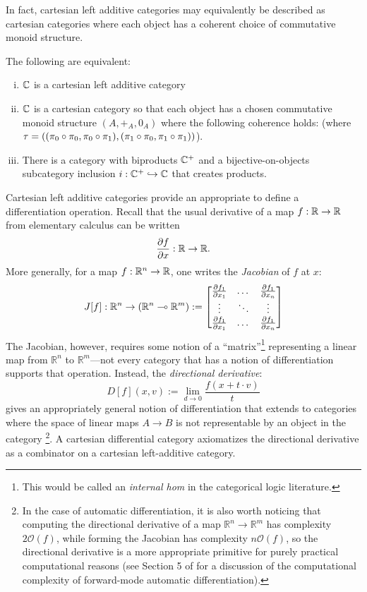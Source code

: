 In fact, cartesian left additive categories may equivalently be described as cartesian categories where each object has a coherent choice of commutative monoid structure.
\begin{proposition}%
    \label{prop:clac-defs}
    The following are equivalent:
    \begin{enumerate}[(i)]
        \item $\mathbb{C}$ is a cartesian left additive category
        \item $\mathbb{C}$ is a cartesian category so that each object has a chosen commutative monoid structure $(A,+_A,0_A)$ where the following coherence holds:  (where $\tau = ((\pi_0\circ \pi_0,\pi_0\circ \pi_1),(\pi_1\circ\pi_0, \pi_1\circ\pi_1))$).
        \item There is a category with biproducts $\mathbb{C}^+$ and a bijective-on-objects subcategory inclusion $i: \mathbb{C}^+ \hookrightarrow\mathbb{C}$ that creates products.
    \end{enumerate}
\end{proposition}

Cartesian left additive categories provide an appropriate to define a differentiation operation. Recall that the usual derivative of a map $f: \mathbb{R} \to \mathbb{R}$ from elementary calculus can be written
\[
    \frac{\partial f}{\partial x}: \mathbb{R} \to \mathbb{R}. 
\]
More generally, for a map $f: \mathbb{R}^n \to \mathbb{R}$, one writes the \emph{Jacobian} of $f$ at $x$:
\[
    J[f]: \mathbb{R}^n \to (\mathbb{R}^n \multimap \mathbb{R}^m) :=
    \begin{bmatrix}
        \frac{\partial f_1}{\partial x_1} & \dots & \frac{\partial f_1}{\partial x_n} \\
        \vdots & \ddots & \vdots \\
        \frac{\partial f_1}{\partial x_1} & \dots & \frac{\partial f_1}{\partial x_n} 
    \end{bmatrix}
\]
The Jacobian, however, requires some notion of a ``matrix''\footnote{This would be called an \emph{internal hom} in the 
 categorical logic literature.} representing a linear map from $\mathbb{R}^n$ to $\mathbb{R}^m$---not every category that has a notion of differentiation supports that operation. Instead, the \emph{directional derivative}:
\[
    D[f](x,v) := \lim_{d \to 0} \frac{f(x + t\cdot v)}{t}
\]
gives an appropriately general notion of differentiation that extends to categories where the space of linear maps $A \to B$ is not representable by an object in the category \footnote{In the case of automatic differentiation, it is also worth noticing that computing the directional derivative of a map $\mathbb{R}^n \to \mathbb{R}^m$ has complexity $2\mathcal{O}(f)$, while forming the Jacobian has complexity $n\mathcal{O}(f)$, so the directional derivative is a more appropriate primitive for purely practical computational reasons (see Section 5 of \cite{hoffmann2016hitchhiker} for a discussion of the computational complexity of forward-mode automatic differentiation).}. 
A cartesian differential category axiomatizes the directional derivative as a combinator on a cartesian left-additive category.


